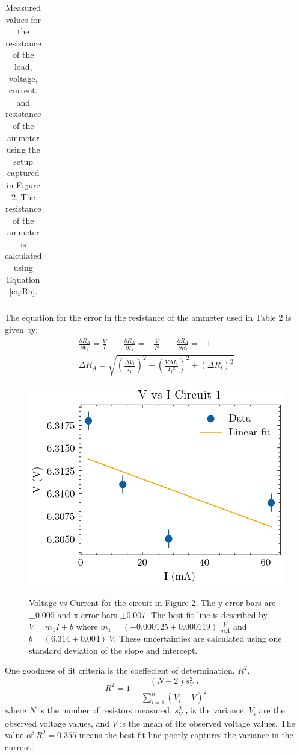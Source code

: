 \documentclass[12pt]{article}
\begin{document}
\begin{table}[H]
\begin{adjustwidth}{-1cm}{}
\begin{tabular}{|l|l|l|l|l|l|l|l|l|lll}
    \end{tabular}
    \end{adjustwidth}
    \label{table:2}
    \caption{Measured values for the resistance of the load, voltage, current, and resistance of the ammeter using the setup captured in Figure 2. The resistance of the ammeter is calculated using Equation \ref{eq:Ra}.}
\end{table}

The equation for the error in the resistance of the ammeter used in Table 2 is given by:
\begin{align}
    \frac{\partial R_A}{\partial V_1} = \frac{V}{I} \qquad
    \frac{\partial R_A}{\partial I_1} = -\frac{V}{I^2} \qquad
    \frac{\partial R_A}{\partial R_l} = -1 \\
    \Delta R_A = \sqrt{\left(\frac{\Delta V_1}{I_1}\right)^2 + \left(\frac{V \Delta I_1}{I{_1}^2}\right)^2 + \left(\Delta R_l\right)^2}
    \label{eq:deltaRa}
\end{align}

\begin{figure}[H]
    \begin{centering}
    \includegraphics[width=0.5 \textwidth]{img/V_vs_I.png}
    \label{fig:v_i_c1}
    \caption{Voltage vs Current for the circuit in Figure 2. The y error bars are $\pm 0.005$ and x error bars $\pm 0.007$. 
    The best fit line is described by $V = m_1I + b$ where $m_1 = (-0.000125 \pm 0.000119)\ \frac{V}{mA}$ and $b = (6.314 \pm  0.004)\ V$. These uncertainties are calculated using one standard deviation of the slope and intercept.}
    \end{centering}
\end{figure}

One goodness of fit criteria is the coeffecient of determination, $R^2$.
\begin{equation}
    R^2 = 1 - \frac{(N-2)s_{V, I}^2}{\sum_{i=1}^{n} (V_i - \bar{V})^2}
\end{equation}
where $N$ is the number of resistors measured, $s_{V, I}^2$ is the variance, $V_i$ are the observed voltage values, and $\bar{V}$ is the mean of the observed voltage values.
The value of $R^2 = 0.355$ means the best fit line poorly captures the variance in the current.
\end{document}
